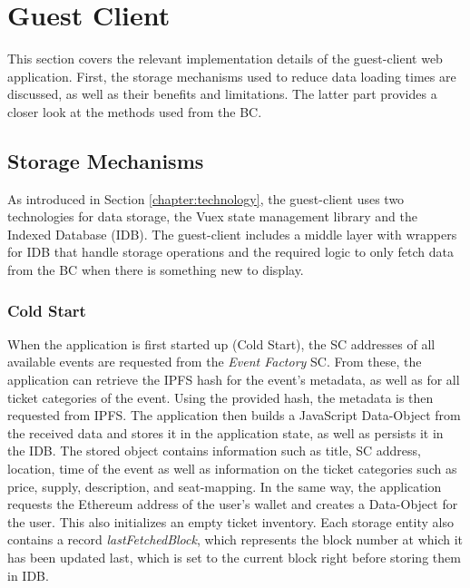 \section{Guest Client}\label{section:imp:guest}

This section covers the relevant implementation details of the guest-client web application. First, the storage mechanisms used to reduce data loading times are discussed, as well as their benefits and limitations. The latter part provides a closer look at the methods used from the BC.

\subsection{Storage Mechanisms}\label{subsection:frontend-storage-mechanism}

As introduced in Section \ref{chapter:technology}, the guest-client uses two technologies for data storage, the Vuex state management library and the Indexed Database (IDB). The guest-client includes a middle layer with wrappers for IDB that handle storage operations and the required logic to only fetch data from the BC when there is something new to display. 

\subsubsection{Cold Start}

When the application is first started up (Cold Start), the SC addresses of all available events are requested from the \textit{Event Factory} SC. From these, the application can retrieve the IPFS hash for the event's metadata, as well as for all ticket categories of the event. Using the provided hash, the metadata is then requested from IPFS. The application then builds a JavaScript Data-Object from the received data and stores it in the application state, as well as persists it in the IDB. The stored object contains information such as title, SC address, location, time of the event as well as information on the ticket categories such as price, supply, description, and seat-mapping.
In the same way, the application requests the Ethereum address of the user's wallet and creates a Data-Object for the user. This also initializes an empty ticket inventory. 
Each storage entity also contains a record \textit{lastFetchedBlock}, which represents the block number at which it has been updated last, which is set to the current block right before storing them in IDB.

